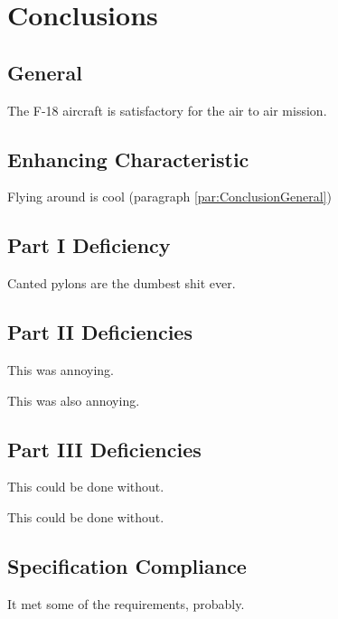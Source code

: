 \chapter{Conclusions}\label{ch:Conclusion}

\section{General}\label{sec:ConclusionGeneral}
\p The F-18 aircraft is satisfactory for the air to air mission. \pp \label{par:ConclusionGeneral}

\section{Enhancing Characteristic}\label{sec:Enhancing}
\p Flying around is cool (paragraph \ref{par:ConclusionGeneral}) \pp \label{par:Enhancing_1}

\section{Part I Deficiency}\label{sec:ConclusionsPartI}
\p Canted pylons are the dumbest shit ever. \pp \label{par:Conc_partI_1}

\section{Part II Deficiencies}\label{sec:ConclusionsPartII}
\p This was annoying. \pp \label{par:Conc_partII_1}

\p This was also annoying. \pp \label{par:Conc_partII_2}

\section{Part III Deficiencies}\label{sec:ConclusionsPartIII}
\p This could be done without. \pp \label{par:Conc_partIII_1}

\p This could be done without. \pp \label{par:Conc_partIII_2}

\section{Specification Compliance}\label{sec:SpecCompliance}
\p It met some of the requirements, probably. \pp \label{par:Spec_comp_1}

\pagebreak